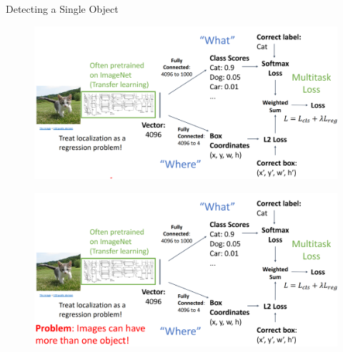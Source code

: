 \begin{frame}[allowframebreaks]{Detecting a Single Object}
\framebreak

\begin{figure}
\centering
\includegraphics[width=1.0\textwidth,height=1.0\textheight,keepaspectratio]{images/obj-det/object_6.png}
\end{figure}

\framebreak

\begin{figure}
\centering
\includegraphics[width=1.0\textwidth,height=1.0\textheight,keepaspectratio]{images/obj-det/object_7.png}
\end{figure}
    
\end{frame}